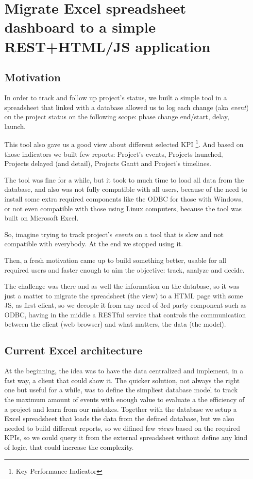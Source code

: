 \part{Migrate Excel spreadsheet dashboard to a simple REST+HTML/JS
application}
\label{c_phaseone}

\chapter*{Motivation}
In order to track and follow up project's status, we built a simple tool in a
spreadsheet that linked with a database allowed us to log each change (aka
\emph{event}) on the project status on the following scope: phase change
end/start, delay, launch.

This tool also gave us a good view about different selected KPI \footnote{Key
Performance Indicator}. And based on those indicators we built few reports:
Project's events, Projects launched, Projects delayed (and detail), Projects
Gantt and Project's timelines.

The tool was fine for a while, but it took to much time to load all data
from the database, and also was not fully compatible with all users, because of
the need to install some extra required components like the ODBC for those with
Windows, or not even compatible with those using Linux computers, because the
tool was built on Microsoft Excel.

So, imagine trying to track project's \emph{events} on a tool that is slow
and not compatible with everybody. At the end we stopped using it.

Then, a fresh motivation came up to build something better,
usable for all required users and faster enough to aim the objective: track,
analyze and decide. 

The challenge was there and as well the information on the database, so it was
just a matter to migrate the spreadsheet (the view) to a HTML page with some JS,
as first client, so we decople it from any need of 3rd party component such as
ODBC, having in the middle a RESTful service that
controls the communication between the client (web browser) and what matters, the data (the model).

\chapter{Current Excel architecture}
At the beginning, the idea was to have the data centralized
\label{t_main_objective} and implement, in a fast way, a client that could show
it. The quicker solution, not always the right one but useful for a while, was
to define the simpliest database model to  track the maximum amount of events with enough value to evaluate a the
efficiency of a project and learn from our mistakes. Together with the database
we setup a Excel spreadsheet that loads the data from the defined database, but
we also needed to build different reports, so we difined few \emph{views} based
on the required KPIs, so we could query it from the external spreadsheet
without define any kind of logic, that could increase the complexity.\\

